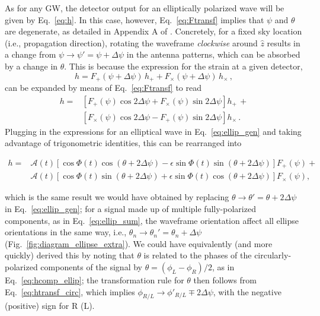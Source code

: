 \documentclass[aps,prd,twocolumn,superscriptaddress,preprintnumbers,floatfix,nofootinbib]{revtex4-2}
\newcommand{\beq}{\begin{equation}}
\newcommand{\eeq}{\end{equation}}
\newcommand*{\eq}[1]{Eq.~\eqref{eq:#1}}
\begin{document}
As for any GW, the detector output for an elliptically polarized wave will be given by \eq{h}.
In this case, however, \eq{Ftransf} implies that $\psi$ and $\theta$ are degenerate, as detailed in Appendix A of \cite{Isi:2017equ}.
Concretely, for a fixed sky location (i.e., propagation direction), rotating the waveframe \emph{clockwise} around $\hat{z}$ results in a change from $\psi \to \psi' = \psi + \Delta\psi$ in the antenna patterns, which can be absorbed by a change in $\theta$.
This is because the expression for the strain at a given detector,
\beq
h = F_+(\psi + \Delta \psi)\, h_+ + F_\times(\psi + \Delta \psi)\, h_\times \, ,
\eeq
can be expanded by means of \eq{Ftransf} to read
\begin{align}
h = &\left[ F_+(\psi) \cos 2\Delta\psi + F_\times(\psi) \sin 2\Delta\psi \right] h_+\, + \\
 &\left[F_\times(\psi) \cos 2\Delta\psi - F_+(\psi)\sin 2\Delta\psi\right] h_\times \, .
\end{align}
Plugging in the expressions for an elliptical wave in \eq{ellip_gen} and taking advantage of trigonometric identities, this can be rearranged into
\begin{widetext}
\begin{align} \label{eq:theta_psi}
h = & \mathcal{A}(t) \left[\cos \Phi(t) \cos(\theta + 2\Delta\psi) -  \epsilon \sin \Phi(t)\sin(\theta + 2\Delta\psi) \right] F_+(\psi) +\nonumber\\
&\mathcal{A}(t) \left[\cos \Phi(t) \sin(\theta + 2\Delta\psi) + \epsilon \sin \Phi(t) \cos(\theta + 2\Delta\psi) \right] F_\times(\psi), 
\end{align}
\end{widetext}
which is the same result we would have obtained by replacing $\theta \to \theta' = \theta + 2 \Delta\psi$ in \eq{ellip_gen};
for a signal made up of multiple fully-polarized components, as in \eq{ellip_sum}, the waveframe orientation affect all ellipse orientations in the same way, i.e., $\theta_n \to \theta_n'=\theta_n + \Delta\psi$ (Fig.~\ref{fig:diagram_ellipse_extra}).
We could have equivalently (and more quickly) derived this by noting that $\theta$ is related to the phases of the circularly-polarized components of the signal by $\theta = \left(\phi_L - \phi_R\right)/2$, as in \eq{hcomp_ellip}; the transformation rule for $\theta$ then follows from \eq{htransf_circ}, which implies $\phi_{R/L} \to \phi'_{R/L} \mp 2\Delta\psi$, with the negative (positive) sign for R (L).
\end{document}

